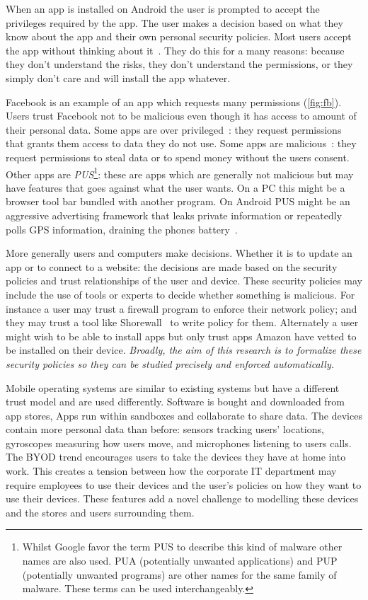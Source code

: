 \documentclass[a4paper,sfsidenotes]{%
  scrartcl%
}
\begin{document}
When an app is installed on Android the user is prompted to accept the
privileges required by the app.  The user makes a decision based on what they
know about the app and their own personal security policies.  Most users accept
the app without thinking about it~\cite{Felt:2012hm}.  They do this for a many
reasons: because they don't understand the risks, they don't understand the
permissions, or they simply don't care and will install the app whatever.

Facebook is an example of an app which requests many permissions
(\autoref{fig:fb}). Users trust Facebook not to be malicious even though it
has access to amount of their personal data.  Some apps are over
privileged~\cite{Felt:2011kj}: they request permissions that grants them access
to data they do not use. Some apps are malicious~\cite{Zhou:2012cf}: they
request permissions to steal data or to spend money without the users consent.
Other apps are \emph{\ac{PUS}}\footnote{Whilst Google favor the term \ac{PUS} to
describe this kind of malware other names are also used. PUA (potentially
unwanted applications) and PUP (potentially unwanted programs) are other names
for the same family of malware.  These terms can be used interchangeably.}:
these are apps which are generally not malicious but may have features that goes
against what the user wants.  On a PC this might be a browser tool bar bundled
with another program.  On Android \ac{PUS} might be an aggressive advertising
framework that leaks private information or repeatedly polls GPS information,
draining the phones battery~\cite{Svajcer:2013tp}.

More generally users and computers make decisions. Whether it is to update an
app or to connect to a website: the decisions are made based on the security
policies and trust relationships of the user and device.  These security
policies may include the use of tools or experts to decide whether something is
malicious.  For instance a user may trust a firewall program to enforce their
network policy; and they may trust a tool like
{Shorewall}~\cite{Shorewall:uh,Tongaonkar:2007ua} to write
policy for them.  Alternately a user might wish to be able to install apps but
only trust apps {Amazon} have vetted to be installed on their device.
\emph{Broadly, the aim of this research is to formalize these security policies
so they can be studied precisely and enforced automatically.}

Mobile operating systems are similar to existing systems but have a
different trust model and are used differently.  Software is
bought and downloaded from app stores, Apps run within sandboxes and collaborate
to share data. The devices contain more personal data
than before: sensors tracking users' locations,  gyroscopes measuring how
users move, and microphones listening to users calls.  The \ac{BYOD} trend
encourages users to take the devices they have at home into work.
This creates a tension between how the corporate IT department may require
employees to use their devices and the user's policies on how they want to use
their devices.  These features add a novel challenge to modelling these devices
and the stores and users surrounding them.  
\end{document}
